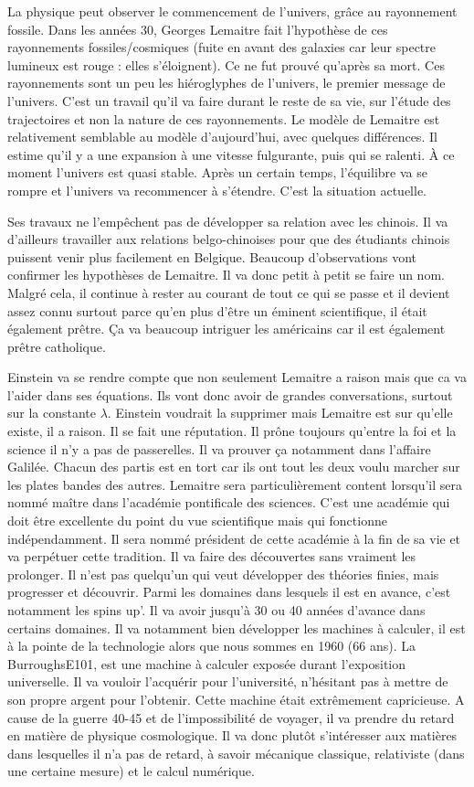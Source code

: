 La physique peut observer le commencement de l'univers, grâce au rayonnement fossile.
Dans les années 30, Georges Lemaitre
fait l'hypothèse de ces rayonnements fossiles/cosmiques (fuite en avant des galaxies car leur spectre lumineux est rouge : elles s'éloignent).
Ce ne fut prouvé qu'après sa mort.
Ces rayonnements sont un peu les hiéroglyphes de l'univers, le premier message de l'univers.
C'est un travail qu'il va faire durant le reste de sa vie, sur l'étude des trajectoires et non la nature de ces rayonnements.
Le modèle de Lemaitre est relativement semblable au modèle d'aujourd'hui, avec quelques différences.
Il estime qu'il y a une expansion à une vitesse fulgurante, puis qui se ralenti.
À ce moment l'univers est quasi stable.
Après un certain temps, l'équilibre va se rompre et l'univers va recommencer à s'étendre.
C'est la situation actuelle.

Ses travaux ne l'empêchent pas de développer sa relation avec les chinois.
Il va d'ailleurs travailler aux relations belgo-chinoises pour que des étudiants chinois puissent venir plus facilement en Belgique.
Beaucoup d'observations vont confirmer les hypothèses de Lemaitre.
Il va donc petit à petit se faire un nom.
Malgré cela, il continue à rester au courant de tout ce qui se passe et il devient assez connu surtout parce qu'en plus d'être un éminent scientifique, il était également prêtre.
Ça va beaucoup intriguer les américains car il est également prêtre catholique.

Einstein va se rendre compte que non seulement Lemaitre a raison mais que ca va l'aider dans ses équations.
Ils vont donc avoir de grandes conversations, surtout sur la constante $\lambda$.
Einstein voudrait la supprimer mais Lemaitre est sur qu'elle existe, il a raison.
Il se fait une réputation.
Il prône toujours qu'entre la foi et la science il n'y a pas de passerelles.
Il va prouver ça notamment dans l'affaire Galilée.
Chacun des partis est en tort car ils ont tout les deux voulu marcher sur les plates bandes des autres.
Lemaitre sera particulièrement content lorsqu'il sera nommé maître dans l'académie pontificale des sciences.
C'est une académie qui doit être excellente du point du vue scientifique mais qui fonctionne indépendamment.
Il sera nommé président de cette académie à la fin de sa vie et va perpétuer cette tradition.
Il va faire des découvertes sans vraiment les prolonger.
Il n'est pas quelqu'un qui veut développer des théories finies, mais progresser et découvrir.
Parmi les domaines dans lesquels il est en avance, c'est notamment les spins up'.
Il va avoir jusqu'à 30 ou 40 années d'avance dans certains domaines.
Il va notamment bien développer les machines à calculer, il est à la pointe de la technologie alors que nous sommes en 1960 (66 ans).
La BurroughsE101, est une machine à calculer exposée durant l'exposition universelle.
Il va vouloir l'acquérir pour l'université, n'hésitant pas à mettre de son propre argent pour l'obtenir.
Cette machine était extrêmement capricieuse.
 A cause de la guerre 40-45 et de l'impossibilité de voyager, il va prendre du retard en matière de physique cosmologique.
Il va donc plutôt s'intéresser aux matières dans lesquelles il n'a pas de retard, à savoir mécanique classique, relativiste (dans une certaine mesure) et le calcul numérique.

